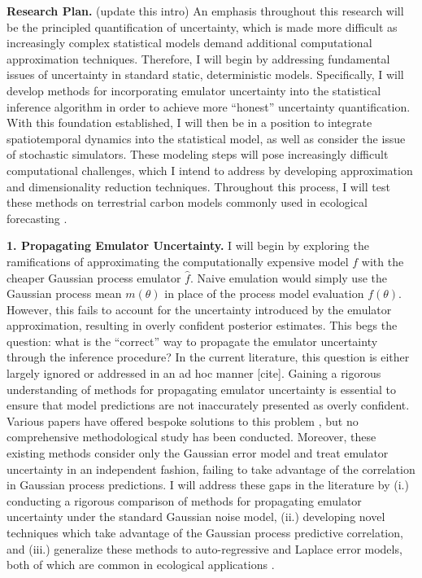 \documentclass[12pt]{article}
\begin{document}
\noindent
\textbf{Research Plan.} (update this intro) An emphasis throughout this research will be the principled quantification of uncertainty, which is made more difficult
as increasingly complex statistical models demand additional computational approximation techniques. Therefore, I will begin by addressing fundamental issues of uncertainty in standard static, deterministic models. Specifically, I will develop methods for incorporating emulator uncertainty into the statistical inference algorithm in order to achieve more ``honest'' uncertainty quantification. With this foundation established, I will then be in a position to integrate spatiotemporal dynamics into the statistical model, as well as consider the issue of stochastic simulators. These modeling steps will pose increasingly difficult computational challenges, which I intend to address by developing approximation and dimensionality reduction techniques. Throughout this process, I will test these methods on terrestrial carbon models commonly used in ecological forecasting \cite{Dietze}. 
 
 \textbf{1. Propagating Emulator Uncertainty.} I will begin by exploring the ramifications of approximating the computationally expensive model $f$ with the  cheaper Gaussian process emulator $\hat{f}$. Naive emulation would simply use the Gaussian process mean $m(\theta)$ in place of the process model evaluation $f(\theta)$. However, this fails to account
 for the uncertainty introduced by the emulator approximation, resulting in overly confident posterior estimates. This begs the question: what is the ``correct'' way to propagate the emulator uncertainty through the inference procedure? In the current literature, this question is either largely ignored or addressed in an ad hoc manner [cite]. Gaining a rigorous understanding of methods for propagating emulator uncertainty is essential to ensure that model predictions are not inaccurately presented as overly confident. Various papers have offered bespoke solutions to this problem \cite{Cleary, Fer}, but no comprehensive
methodological study has been conducted. Moreover, these existing methods consider only the Gaussian error model and treat emulator uncertainty in an independent fashion, failing to take advantage of the correlation in Gaussian process predictions. I will address these gaps in the literature by (i.) conducting a rigorous comparison of methods for propagating emulator uncertainty under the standard Gaussian noise model, (ii.) developing novel techniques which take advantage of the Gaussian process predictive correlation, and (iii.) generalize these methods to auto-regressive and Laplace error models, both of which 
are common in ecological applications \cite{Fer}. 
\end{document}
